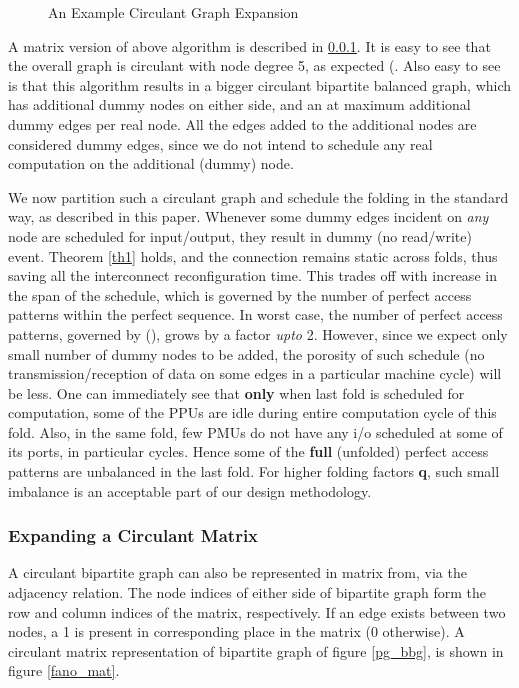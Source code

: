 \documentclass[12pt]{article}
\begin{document}
\begin{figure}[h]
\begin{center}
\qquad
{}
\end{center}
\caption{An Example Circulant Graph Expansion}
\label{graph_expand}
\end{figure}

A matrix version of above algorithm is described in \ref{mat_exp_sec}. It is easy to see that the overall graph is circulant with node degree 5,
as expected (. Also easy to see is that this
algorithm results in a bigger circulant bipartite balanced graph, which has
 additional dummy nodes on either side, and an at maximum
 additional dummy edges per real node.
All the edges added to the additional nodes are considered dummy edges,
since we do not intend to schedule any real computation on the additional
(dummy) node.

We now partition such a circulant graph and schedule the folding
in the standard way, as described in this paper. Whenever some dummy edges
incident on \textit{any} node are scheduled for input/output, they result
in dummy (no read/write) event. Theorem \ref{th1} holds, and the connection
remains static across folds, thus saving all the interconnect
reconfiguration time. This trades off with increase in the span of
the schedule, which is governed by the number of perfect access patterns
within the perfect sequence. In worst case, the number of perfect access
patterns, governed by ({\large }), grows by a factor
\textit{upto} 2. However, since we expect only small number of dummy nodes to
be added, the porosity of such schedule (no transmission/reception of data
on some edges in a particular machine cycle) will be less.
One can immediately see that \textbf{only} when
last fold is scheduled for computation, some of the PPUs are
idle during entire computation cycle of this fold.
Also, in the same fold, few
PMUs do not have any i/o scheduled at some of its ports,
in particular cycles. Hence some of the \textbf{full} (unfolded)
perfect access patterns are unbalanced in the last fold. For higher folding
factors \textbf{q}, such small imbalance is an acceptable part of our
design methodology.

\subsubsection{Expanding a Circulant Matrix}
\label{mat_exp_sec}
A circulant bipartite graph can also be represented in matrix from, via the
adjacency relation. The node indices of either side of bipartite graph form
the row and column indices of the matrix, respectively. If an edge exists
between two nodes, a 1 is present in corresponding place in the
matrix (0 otherwise). A  circulant matrix representation of
bipartite graph of figure \ref{pg_bbg}, is shown in figure
\ref{fano_mat}.
\end{document}
